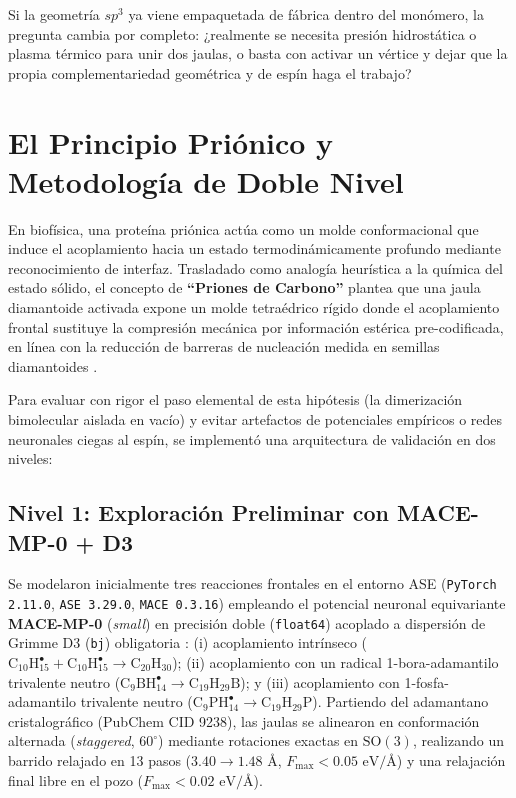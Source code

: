 \documentclass[10pt,twocolumn,a4paper]{article}
\begin{document}
Si la geometría $sp^3$ ya viene empaquetada de fábrica dentro del monómero, la pregunta cambia por completo: ¿realmente se necesita presión hidrostática o plasma térmico para unir dos jaulas, o basta con activar un vértice y dejar que la propia complementariedad geométrica y de espín haga el trabajo?

\section{El Principio Priónico y Metodología de Doble Nivel}
En biofísica, una proteína priónica actúa como un molde conformacional que induce el acoplamiento hacia un estado termodinámicamente profundo mediante reconocimiento de interfaz. Trasladado como analogía heurística a la química del estado sólido, el concepto de \textbf{``Priones de Carbono''} plantea que una jaula diamantoide activada expone un molde tetraédrico rígido donde el acoplamiento frontal sustituye la compresión mecánica por información estérica pre-codificada, en línea con la reducción de barreras de nucleación medida en semillas diamantoides \cite{Gebbie2018}.

Para evaluar con rigor el paso elemental de esta hipótesis (la dimerización bimolecular aislada en vacío) y evitar artefactos de potenciales empíricos o redes neuronales ciegas al espín, se implementó una arquitectura de validación en dos niveles:

\subsection{Nivel 1: Exploración Preliminar con MACE-MP-0 + D3}
Se modelaron inicialmente tres reacciones frontales en el entorno ASE (\texttt{PyTorch 2.11.0}, \texttt{ASE 3.29.0}, \texttt{MACE 0.3.16}) empleando el potencial neuronal equivariante \textbf{MACE-MP-0} (\textit{small}) \cite{Batatia2024} en precisión doble (\texttt{float64}) acoplado a dispersión de Grimme D3 (\texttt{bj}) obligatoria \cite{Grimme2010}: (i) acoplamiento intrínseco ($\text{C}_{10}\text{H}_{15}^\bullet + \text{C}_{10}\text{H}_{15}^\bullet \to \text{C}_{20}\text{H}_{30}$); (ii) acoplamiento con un radical 1-bora-adamantilo trivalente neutro ($\text{C}_9\text{BH}_{14}^\bullet \to \text{C}_{19}\text{H}_{29}\text{B}$); y (iii) acoplamiento con 1-fosfa-adamantilo trivalente neutro ($\text{C}_9\text{PH}_{14}^\bullet \to \text{C}_{19}\text{H}_{29}\text{P}$). Partiendo del adamantano cristalográfico (PubChem CID 9238), las jaulas se alinearon en conformación alternada (\textit{staggered}, $60^\circ$) mediante rotaciones exactas en $\text{SO}(3)$, realizando un barrido relajado en 13 pasos ($3.40 \to 1.48\text{ \AA}$, $F_{\text{max}} < 0.05\text{ eV/\AA}$) y una relajación final libre en el pozo ($F_{\text{max}} < 0.02\text{ eV/\AA}$).
\end{document}

